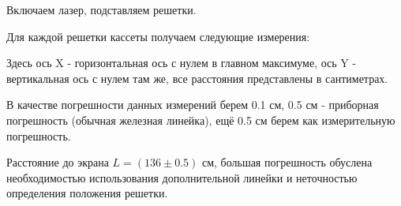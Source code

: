 \documentclass[a4paper,12pt]{extarticle}
\begin{document}
\begin{minipage}[]{0.45\textwidth} 
    Включаем лазер, подставляем решетки. 
    
    Для каждой решетки кассеты получаем следующие измерения: 

    Здесь ось X - горизонтальная ось с нулем в главном максимуме, ось Y - вертикальная ось с нулем там же, все расстояния представлены в сантиметрах.

    В качестве погрешности данных измерений берем 0.1 см, 0.5 см - приборная погрешность (обычная железная линейка), ещё 0.5 см берем как измерительную погрешность.

    Расстояние до экрана $L = (136\pm0.5)$ см, большая погрешность обуслена необходимостью использования дополнительной линейки и неточностью определения положения решетки.
\end{minipage}%
\hfill 
\end{document}
